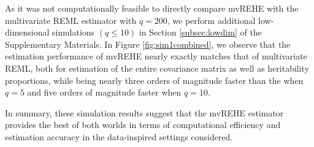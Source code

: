 \documentclass[12pt]{article}
\begin{document}


As it was not computationally feasible to directly compare mvREHE with the multivariate REML estimator with $q = 200$, we perform additional low-dimensional simulations $(q \leq 10)$ in Section \ref{subsec:lowdim} of the Supplementary Materials. In Figure \ref{fig:sim1combined}, we observe that the estimation performance of mvREHE nearly exactly matches that of multivariate REML, both for estimation of the entire covariance matrix as well as heritability proportions, while being nearly three orders of magnitude faster than the when $q = 5$ and five orders of magnitude faster when $q = 10$. %

In summary, these simulation results suggest that the mvREHE estimator provides the best of both worlds in terms of computational efficiency and estimation accuracy in the data-inspired settings considered.

\end{document}
